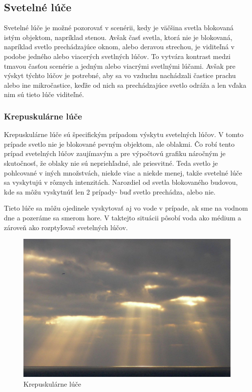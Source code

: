 \documentclass[10pt,twoside,slovak,a4paper]{article}
\begin{document}
\subsection{Svetelné lúče} \label{se:luce}
Svetelné lúče je možné pozorovať v scenérii, kedy je väčšina svetla blokovaná istým 
objektom, napríklad stenou. Avšak časť svetla, ktorá nie je blokovaná, napríklad svetlo 
prechádzajúce oknom, alebo deravou strechou, je viditeľná v podobe jedného alebo viacerých 
svetlných lúčov. To vytvára kontrast medzi tmavou časťou scenérie a jedným alebo viacrými 
svetlnými lúčami. Avšak pre výskyt týchto lúčov je potrebné, aby sa vo vzduchu nachádzali 
častice prachu alebo ine mikročastice, keďže od nich sa prechádzajúce svetlo odráža a 
len vďaka nim sú tieto lúče viditeľné.

\subsubsection{Krepuskulárne lúče} \label{se:luce:kl}
Krepuskulárne lúče sú špecifickým prípadom výskytu svetelných lúčov. V tomto prípade svetlo 
nie je blokované pevným objektom, ale oblakmi. Čo robí tento prípad svetelných lúčov 
zaujímavým a pre výpočtovú grafiku náročným je skutočnosť, že oblaky nie sú nepriehľadné, 
ale priesvitné. Teda svetlo je pohlcované v iných množstvách, niekde viac a niekde menej, 
takže svetelné lúče sa vyskytujú v rôznych intenzitách. Narozdiel od svetla blokovaného 
budovou, kde sa môžu vyskytnúť len 2 prípady- buď svetlo prechádza, 
alebo nie.\cite{Crepuscular_rays}

Tieto lúče sa môžu ojedinele vyskytovať aj vo vode v prípade, ak sme na vodnom dne a 
pozeráme sa smerom hore. V taktejto situácii pôsobí voda ako médium a zároveň ako 
rozptyľovač svetelných lúčov. 

\begin{figure}[h]
    \centering
    \includegraphics[scale=0.2]{god_ray.jpg}
    \caption{Krepuskulárne lúče}
    \label{fig:kl}
\end{figure}
\end{document}
